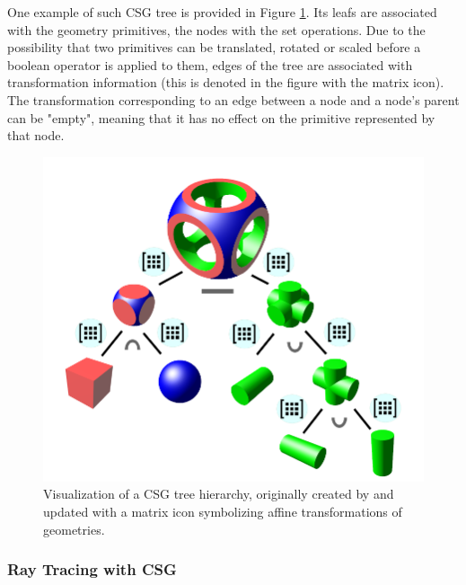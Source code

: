 One example of such CSG tree is provided in Figure \ref{fig:csg_tree}. Its leafs are associated with the geometry primitives, the nodes with the set operations. Due to the possibility that two primitives can be translated, rotated or scaled before a boolean operator is applied to them, edges of the tree are associated with transformation information (this is denoted in the figure with the matrix icon). The transformation corresponding to an edge between a node and a node's parent can be "empty", meaning that it has no effect on the primitive represented by that node.  

\begin{figure}
	\centering
	\includegraphics[width=.9\linewidth]{img/1 fundamentals/csg_tree.png}
	\caption{Visualization of a CSG tree hierarchy, originally created by \cite{csgtree} and updated
	with a matrix icon symbolizing affine transformations of geometries.}
	\label{fig:csg_tree}
\end{figure}

\subsubsection{Ray Tracing with CSG}

